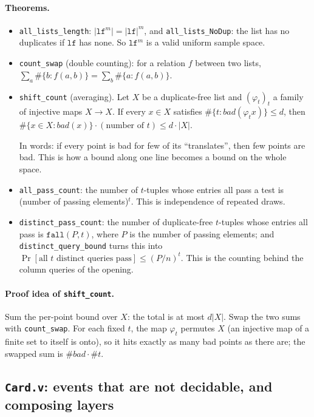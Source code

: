 \documentclass[11pt,a4paper]{article}
\theoremstyle{definition}
\theoremstyle{plain}
\begin{document}
\paragraph{Theorems.}
\begin{itemize}[leftmargin=1.3em]
\item \texttt{all\_lists\_length}: $|\mathtt{lf}^m|=|\mathtt{lf}|^m$, and \texttt{all\_lists\_NoDup}:
  the list has no duplicates if $\mathtt{lf}$ has none. So $\mathtt{lf}^m$ is a valid uniform
  sample space.
\item \texttt{count\_swap} (double counting): for a relation $f$ between two lists,
  $\sum_{a}\#\{b: f(a,b)\}=\sum_b\#\{a:f(a,b)\}$.
\item \texttt{shift\_count} (averaging). Let $X$ be a duplicate-free list and $(\varphi_t)_{t}$ a
  family of injective maps $X\to X$. If every $x\in X$ satisfies $\#\{t:\mathit{bad}(\varphi_t x)\}\le d$,
  then $\#\{x\in X:\mathit{bad}(x)\}\cdot(\text{number of } t)\le d\cdot|X|$.

  In words: if every point is bad for few of its ``translates'', then few points are bad. This is
  how a bound along one line becomes a bound on the whole space.
\item \texttt{all\_pass\_count}: the number of $t$-tuples whose entries all pass a test is
  (number of passing elements)$^t$. This is independence of repeated draws.
\item \texttt{distinct\_pass\_count}: the number of duplicate-free $t$-tuples whose entries all pass
  is $\mathtt{fall}(P,t)$, where $P$ is the number of passing elements; and
  \texttt{distinct\_query\_bound} turns this into $\Pr[\text{all } t \text{ distinct queries pass}]
  \le (P/n)^t$. This is the counting behind the column queries of the opening.
\end{itemize}

\paragraph{Proof idea of \texttt{shift\_count}.} Sum the per-point bound over $X$: the total is at
most $d|X|$. Swap the two sums with \texttt{count\_swap}. For each fixed $t$, the map $\varphi_t$
permutes $X$ (an injective map of a finite set to itself is onto), so it hits exactly as many bad
points as there are; the swapped sum is $\#\mathit{bad}\cdot\#t$.

\subsection{\texttt{Card.v}: events that are not decidable, and composing layers}
\end{document}
